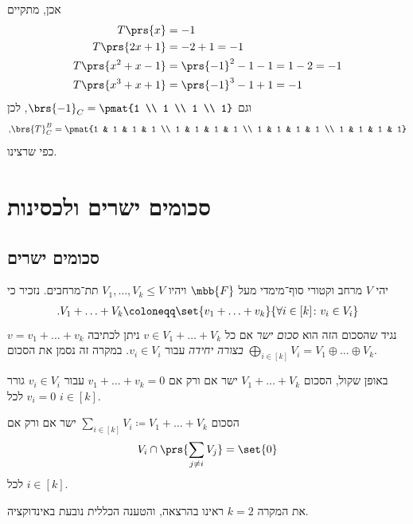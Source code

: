 \documentclass[a4paper,10pt,twoside,openany]{book}
\begin{document}
\begin{solution}
אכן, מתקיים
\begin{align*}
T\prs{x} &= -1 \\
T\prs{2x+1} &= -2 + 1 = -1 \\
T\prs{x^2 + x - 1} &= \prs{-1}^2 -1 - 1 = 1 - 2 = -1 \\
T\prs{x^3 + x + 1} &= \prs{-1}^3 -1 +1 = -1
\end{align*}
וגם
$\brs{-1}_C = \pmat{1 \\ 1 \\ 1 \\ 1}$,
לכן
\[\text{,} \brs{T}^B_C = \pmat{1 & 1 & 1 & 1 \\ 1 & 1 & 1 & 1 \\ 1 & 1 & 1 & 1 \\ 1 & 1 & 1 & 1}\]
כפי שרצינו.
\end{solution}

\chapter{סכומים ישרים ולכסינות}

\section{סכומים ישרים}

\begin{definition}
יהי
$V$
מרחב וקטורי סוף־מימדי מעל
$\mbb{F}$
ויהיו
$V_1, \ldots, V_k \leq V$
תת־מרחבים.
נזכיר כי
\begin{align*}
\text{.} V_1 + \ldots + V_k \coloneqq \set{v_1 + \ldots + v_k}{\forall i \in [k] \colon v_i \in V_i}
\end{align*}
נגיד שהסכום הזה הוא
\emph{סכום ישר}
אם כל
$v \in V_1 + \ldots + V_k$
ניתן לכתיבה
$v = v_1 + \ldots + v_k$
\emph{בצורה יחידה}
עבור
$v_i \in V_i$.
במקרה זה נסמן את הסכום
$\bigoplus_{i \in [k]} V_i = V_1 \oplus \ldots \oplus V_k$.
\end{definition}

\begin{remark}
באופן שקול, הסכום
$V_1 + \ldots + V_k$
ישר אם ורק אם
$v_1 + \ldots + v_k = 0$
עבור
$v_i \in V_i$
גורר
$v_i = 0$
לכל
$i \in [k]$.
\end{remark}

\begin{proposition}
הסכום
$\sum_{i \in [k]} V_i \coloneqq V_1 + \ldots + V_k$
ישר אם ורק אם
\[V_i \cap \prs{\sum_{j \neq i} V_j} = \set{0}\]
לכל
$i \in [k]$.

את המקרה
$k = 2$
ראינו בהרצאה, והטענה הכללית נובעת באינדוקציה.
\end{proposition}
\end{document}
